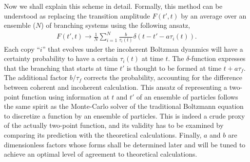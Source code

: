 Now we shall explain this scheme in detail.
Formally, this method can be understood as replacing the transition amplitude $F(t',t)$ by an average over an ensemble ($N$) of branching systems using the following ansatz,
\begin{eqnarray}
F(t', t) \rightarrow \frac{1}{N}\sum_{i=1}^N \frac{b}{\tau_i(t)} \delta(t-t'- a \tau_i(t)).
\end{eqnarray}
Each copy ``$i$'' that evolves under the incoherent Boltzman dyanmics will have a certainty probability to have a certain $\tau_i(t)$ at time $t$.
The $\delta$-function expresses that the branching that starts at time $t'$  is thought to be formed at time $t+a\tau_f$.
The additional factor $b/\tau_f$ corrects the probability, accounting for the difference between coherent and incoherent calculation.
This ansatz of representing a two-point function using information at $t$ and $t'$ of an ensemble of particles follows the same spirit as the Monte-Carlo solver of the traditional Boltzmann equation to discretize a function by an ensemble of particles.
This is indeed a crude proxy of the actually two-point function, and its validity has to be examined by comparing its prediction with the theoretical calculations.
Finally, $a$ and $b$ are dimensionless factors whose forms shall be determined later and will be tuned to achieve an optimal level of agreement to theoretical calculations.

